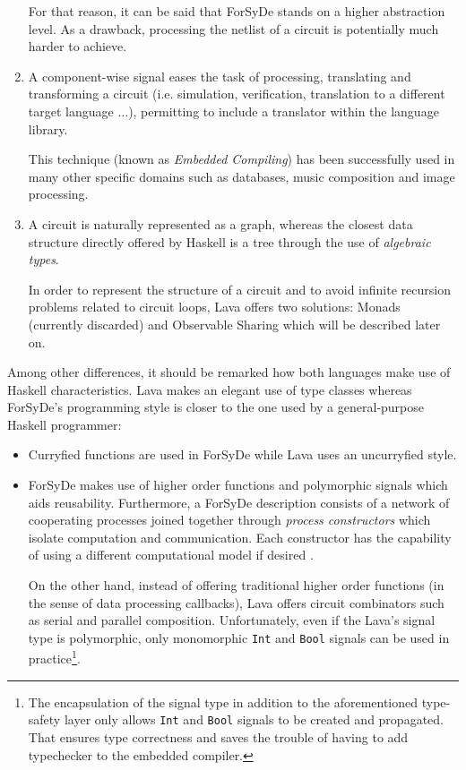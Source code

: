 \documentclass[a4paper,twoside,11pt]{article}
\begin{document}
\begin{body}
\begin{enumerate}[1)]
  For that reason, it can be said that ForSyDe stands on a higher
  abstraction level. As a drawback, processing the netlist of a
  circuit is potentially much harder to achieve.
  
\item A component-wise signal eases the task of processing,
  translating and transforming a circuit (i.e. simulation,
  verification, translation to a different target language $\dots$),
  permitting to include a translator within the language library.

  This technique (known as \textit{Embedded Compiling}\cite{building})
  has been successfully used in many other specific domains such as
  databases\cite{dsec:db}, music composition\cite{haskore} and image
  processing\cite{dsec:graphics}.
  

\item A circuit is naturally represented as a graph, whereas the closest
  data structure directly offered by Haskell is a tree through the use of
  \textit{algebraic types}.
  
  In order to represent the structure of a circuit and to avoid
  infinite recursion problems related to circuit loops, Lava offers
  two solutions: Monads (currently discarded) and Observable Sharing which
  will be described later on.
\end{enumerate}

Among other differences, it should be remarked how both languages make
use of Haskell characteristics. Lava makes an elegant use of type
classes whereas ForSyDe's programming style is closer to the one used by a
general-purpose Haskell programmer:

\begin{itemize}
  \item Curryfied functions are used in ForSyDe while Lava uses
    an uncurryfied style.

  \item ForSyDe makes use of higher order functions and polymorphic
    signals which aids reusability. Furthermore, a ForSyDe description
    consists of a network of cooperating processes joined together through
    \textit{process constructors} which isolate computation and
    communication. Each constructor has the capability of using a different
    computational model if desired \cite{models}.

    On the other hand, instead of offering traditional higher order functions
    (in the sense of data processing callbacks), Lava offers circuit
    combinators such as serial and parallel composition.  Unfortunately, even
    if the Lava's signal type is polymorphic, only monomorphic \texttt{Int}
    and \texttt{Bool} signals can be used in practice\footnote{The
      encapsulation of the signal type in addition to the aforementioned
      type-safety layer only allows \texttt{Int} and \texttt{Bool} signals to
      be created and propagated. That ensures type correctness and saves the
      trouble of having to add typechecker to the embedded compiler.}.


\end{itemize}
\end{body}
\end{document}
